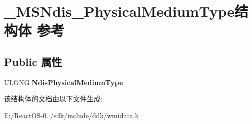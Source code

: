 \hypertarget{struct___m_s_ndis___physical_medium_type}{}\section{\+\_\+\+M\+S\+Ndis\+\_\+\+Physical\+Medium\+Type结构体 参考}
\label{struct___m_s_ndis___physical_medium_type}
\subsection*{Public 属性}
\begin{DoxyCompactItemize}
\item 
\mbox{\label{struct___m_s_ndis___physical_medium_type_a8fa65c9d19a2ea2e731d622a2799cf65}} 
U\+L\+O\+NG {\bfseries Ndis\+Physical\+Medium\+Type}
\end{DoxyCompactItemize}


该结构体的文档由以下文件生成\+:\begin{DoxyCompactItemize}
\item 
E\+:/\+React\+O\+S-\/0../sdk/include/ddk/wmidata.\+h\end{DoxyCompactItemize}
